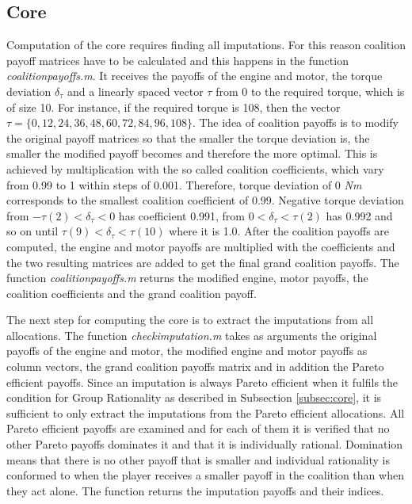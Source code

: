 \subsection{Core}
Computation of the core requires finding all imputations. For this reason coalition payoff matrices have  to be calculated and this happens in the function \textit{coalitionpayoffs.m}. It receives the payoffs of the engine and motor, the torque deviation $\delta_{\tau}$ and a linearly spaced vector $\tau$ from 0 to the required torque, which is of size 10. For instance, if the required torque is 108, then the vector  $\tau = \{0,12,24,36,48,60,72,84,96,108\}$. The idea of coalition payoffs is to modify the original payoff matrices so that the smaller the torque deviation is, the smaller the modified payoff becomes and therefore the more optimal. This is achieved by multiplication with the so called coalition coefficients, which vary from 0.99 to 1 within steps of 0.001. Therefore, torque deviation of 0 \textit{Nm} corresponds to the smallest coalition coefficient of 0.99. Negative torque deviation from $-\tau(2) < \delta_{\tau} < 0$ has coefficient 0.991, from $ 0 < \delta_{\tau} < \tau(2)$ has 0.992 and so on until $\tau(9) < \delta_{\tau} < \tau(10)$ where it is 1.0. After the coalition payoffs are computed, the engine and motor payoffs are multiplied with the coefficients and the two resulting matrices are added to get the final grand coalition payoffs. The function \textit{coalitionpayoffs.m} returns the modified engine, motor payoffs, the coalition coefficients and the grand coalition payoff. 

The next step for computing the core is to extract the imputations from all allocations. The function \textit{checkimputation.m} takes as arguments the original payoffs of the engine and motor, the modified engine and motor payoffs as column vectors, the grand coalition payoffs matrix and in addition the Pareto efficient payoffs. Since an imputation is always Pareto efficient when it fulfils the condition for Group Rationality as described in Subsection \ref{subsec:core}, it is sufficient to only extract the imputations from the Pareto efficient allocations. All Pareto efficient payoffs are examined and for each of them it is verified that no other Pareto payoffs dominates it and that it is individually rational. Domination means that there is no other payoff that is smaller and individual rationality is conformed to when the player receives a smaller payoff in the coalition than when they act alone. The function returns the imputation payoffs and their indices.

